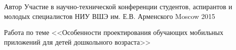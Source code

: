 \begin{cventries}
\cventry
{Автор} %
{Участие в научно-технической конференции студентов, аспирантов и молодых специалистов НИУ ВШЭ им. Е.В. Арменского} %
{Moscow} %
{2015} %
{ %
\begin{cvitems}
\item {Работа по теме <<Особенности проектирования обучающих мобильных приложений для детей дошкольного возраста>>}
\end{cvitems}
}

\end{cventries}